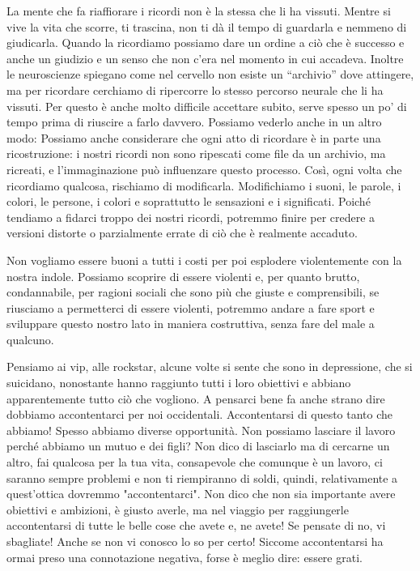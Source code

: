 \documentclass[12pt]{book} %
\begin{document}
La mente che fa riaffiorare i ricordi non è la stessa che li ha vissuti. 
Mentre si vive la vita che scorre, ti trascina, non ti dà il tempo di guardarla e nemmeno di
giudicarla. Quando la ricordiamo possiamo dare un ordine a ciò che è successo e anche un giudizio e un senso che non
c'era nel momento in cui accadeva. Inoltre le neuroscienze spiegano come nel cervello non esiste
un “archivio” dove attingere, ma per ricordare cerchiamo di ripercorre lo stesso percorso neurale che li ha vissuti.
Per questo è anche molto difficile accettare subito, serve spesso un po' di tempo prima di
riuscire a farlo davvero. Possiamo vederlo anche in un altro modo: Possiamo anche considerare che ogni atto di ricordare è in parte una ricostruzione: i nostri ricordi non sono ripescati come file da un archivio, ma ricreati, e l’immaginazione può influenzare questo processo. Così, ogni volta che ricordiamo qualcosa, rischiamo di modificarla. Modifichiamo i suoni, le
parole, i colori, le persone, i colori e soprattutto le sensazioni e i significati. Poiché tendiamo a fidarci troppo dei nostri ricordi, potremmo finire per credere a versioni distorte o parzialmente errate di ciò che è realmente accaduto.

Non vogliamo essere buoni a tutti i costi per poi esplodere violentemente con la nostra indole.
Possiamo scoprire di essere violenti e, per quanto brutto, condannabile, per ragioni sociali che sono più che giuste e
comprensibili, se riusciamo a permetterci di essere violenti, potremmo andare a fare sport e sviluppare questo nostro lato in maniera costruttiva, senza fare del male a qualcuno.

Pensiamo ai vip, alle rockstar, alcune volte si sente che sono in depressione, che si suicidano, nonostante hanno
raggiunto tutti i loro obiettivi e abbiano apparentemente tutto ciò che vogliono. A pensarci bene fa anche strano dire dobbiamo accontentarci per noi
occidentali. Accontentarsi di questo tanto che abbiamo!
Spesso abbiamo diverse opportunità. Non possiamo lasciare il lavoro perché abbiamo un mutuo e dei figli? Non dico di
lasciarlo ma di cercarne un altro, fai qualcosa per la tua vita, consapevole che comunque è un lavoro, ci saranno
sempre problemi e non ti riempiranno di soldi, quindi, relativamente a quest'ottica dovremmo "accontentarci". Non dico che non sia importante avere obiettivi e ambizioni, è giusto averle, ma nel viaggio per
raggiungerle accontentarsi di tutte le belle cose che avete e, ne avete! Se pensate di no, vi sbagliate! Anche se non vi
conosco lo so per certo! Siccome accontentarsi ha ormai preso una connotazione negativa, forse è meglio dire: essere grati.
\end{document}
